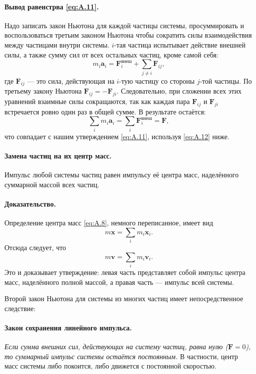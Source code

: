 \paragraph{Вывод равенстрва \eqref{eq:A.11}.}
Надо записать закон Ньютона для каждой частицы системы, просуммировать и воспользоваться
третьим законом Ньютона чтобы сократить силы взаимодействия между частицами внутри системы.
$i$-тая частица испытывает действие внешней силы, а также сумму сил от всех остальных частиц, кроме самой себя:
\[
m_i \mathbf{a}_i = \mathbf{F}_i^{\text{внеш}} + \sum_{j \neq i} \mathbf{F}_{ij},
\]
где $\mathbf{F}_{ij}$ — это сила, действующая на $i$-тую частицу
со стороны $j$-той частицы.
По третьему закону Ньютона $\mathbf{F}_{ij} = -\mathbf{F}_{ji}$.
Следовательно, при сложении всех этих уравнений взаимные силы
сокращаются, так как каждая пара $\mathbf{F}_{ij}$ и $\mathbf{F}_{ji}$
встречается ровно один раз в общей сумме.
В результате остаётся:
\[
\sum_i m_i \mathbf{a}_i = \sum_i \mathbf{F}_i^{\text{внеш}} = \mathbf{F},
\]
что совпадает с нашим утверждением \eqref{eq:A.11}, используя \eqref{eq:A.12} ниже.

\paragraph{Замена частиц на их центр масс.}
Импульс любой системы частиц равен импульсу её центра масс, наделённого суммарной массой всех частиц.

\paragraph{Доказательство.}
Определение центра масс \eqref{eq:A.8}, немного
переписанное, имеет вид
\begin{equation}
    m \mathbf{x} = \sum_i m_i \mathbf{x}_i.
    \label{A.12}
\end{equation}
Отсюда следует, что
\[
m \mathbf{v} = \sum_i m_i \mathbf{v}_i.
\]
Это и доказывает утверждение: левая часть представляет собой импульс центра масс, наделённого полной массой,
а правая часть — импульс всей системы.

Второй закон Ньютона для системы из многих частиц имеет непосредственное следствие:

\paragraph{Закон сохранения линейного импульса.} \emph{Если сумма внешних сил, действующих на систему частиц, равна нулю ($\mathbf{F} = 0$), то суммарный импульс системы остаётся постоянным.}
В частности, центр масс системы либо покоится, либо движется с постоянной скоростью.

